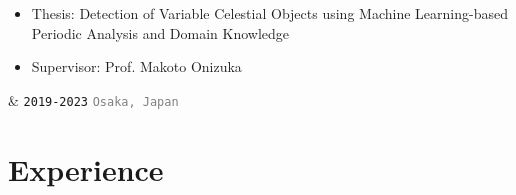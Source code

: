 \documentclass[9pt,a4paper]{article}
\newcommand{\Prof}[1]{Prof.\! #1}
\newcommand{\MOnizuka}{Makoto Onizuka}
\newcommand{\Duration}[2]{\fontsize{10pt}{0}\selectfont \texttt{#1-#2}}
\begin{document}
\begin{EntriesTableRight}
  \vspace{-0.1em}
  \newline
  {\setlength{\leftmargini}{17.2pt}
  \begin{itemize}
  \vspace{-1.0em}
      \item Thesis: Detection of Variable Celestial Objects using Machine Learning-based Periodic Analysis and Domain Knowledge
      \item Supervisor: \Prof{\MOnizuka}
  \vspace{-1.3em}
  \end{itemize}}
  &
  \hfill
  \Duration{2019}{2023}
  \vspace{0.5em}
  \newline
  \hfill
  \textcolor{gray}{\fontsize{9pt}{0}\selectfont \texttt{Osaka, \!\!Japan}~}
\end{EntriesTableRight}

\section{Experience}
\end{document}
